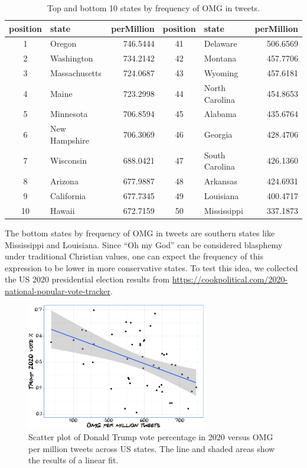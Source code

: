 \documentclass[]{article}
\begin{document}
\begin{table}[h]
\centering
\begin{tabular}{|c|l|r||c|l|r|}
\hline
position & state & perMillion &  position & state & perMillion\\
\hline
\hline
1 & Oregon & 746.5444 & 41 & Delaware & 506.6569\\
\hline
2 & Washington & 734.2142 & 42 & Montana & 457.7706\\
\hline
3 & Massachusetts & 724.0687 & 43 & Wyoming & 457.6181\\
\hline
4 & Maine & 723.2998 & 44 & North Carolina & 454.8653\\
\hline
5 & Minnesota & 706.8594 & 45 & Alabama & 435.6764\\
\hline
6 & New Hampshire & 706.3069 & 46 & Georgia & 428.4706\\
\hline
7 & Wisconsin & 688.0421 & 47 & South Carolina & 426.1360\\
\hline
8 & Arizona & 677.9887 & 48 & Arkansas & 424.6931\\
\hline
9 & California & 677.7345 & 49 & Louisiana & 400.4717\\
\hline
10 & Hawaii & 672.7159 & 50 & Mississippi & 337.1873\\
\hline
\end{tabular}
\caption{Top and bottom 10 states by frequency of OMG in tweets.}
\end{table}



\newpage

The bottom states by frequency of OMG in tweets are southern states like Mississippi and Louisiana. Since ``Oh my God'' can be considered blasphemy under traditional Christian values, one can expect the frequency of this expression to be lower in more conservative states. To test this idea, we collected the US 2020 presidential election results from \url{https://cookpolitical.com/2020-national-popular-vote-tracker}.


\begin{figure}

{\centering \includegraphics[width=0.7\textwidth]{Friends_HPS_pdf_files/figure-latex/twittertrump-1} 

}

\caption{Scatter plot of Donald Trump vote percentage in 2020 versus OMG per million tweets across US states. The line and shaded areas show the results of a linear fit.}\label{fig:twittertrump}
\end{figure}
\end{document}
